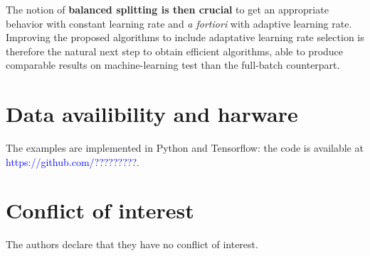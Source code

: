 \documentclass[article,authoryear,jmlmc]{beg_32}             %
\begin{document}
The notion of \textbf{balanced splitting is then crucial} to get an appropriate behavior with constant learning rate and {\em a fortiori} with adaptive learning rate. Improving the
proposed algorithms to include adaptative learning rate selection is therefore the natural next step to obtain efficient algorithms, able to produce comparable results on
machine-learning test than the full-batch counterpart. %



\section*{Data availibility and harware}
The examples are implemented in Python and Tensorflow: the code is available at \textcolor{blue} {https://github.com/?????????}. 

\section*{Conflict of interest}
The authors declare that they have no conflict of interest.

\newpage

%




\appendix
\end{document}
